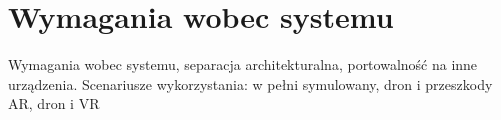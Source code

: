 \newpage
\section{Wymagania wobec systemu}
\begin{todo}
    Wymagania wobec systemu, separacja architekturalna, portowalność na inne urządzenia. Scenariusze wykorzystania: w pełni symulowany, dron i przeszkody AR, dron i VR
\end{todo}